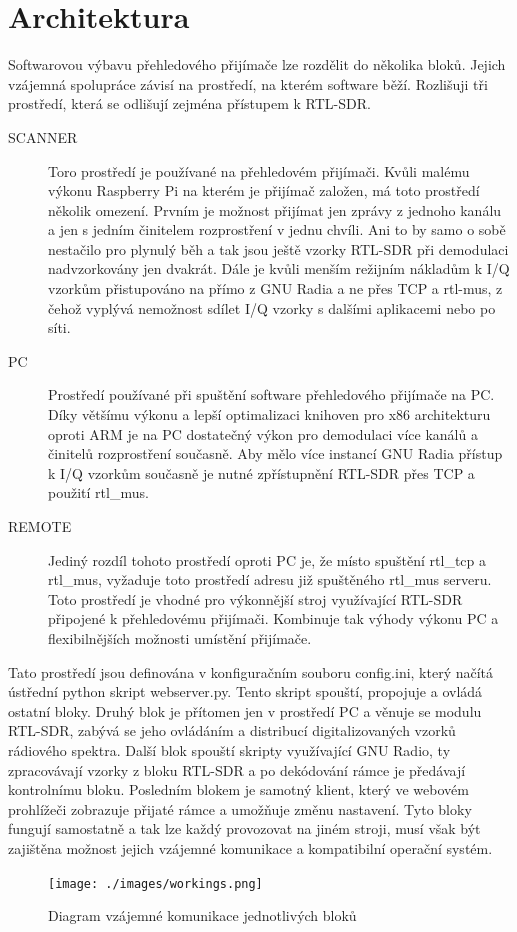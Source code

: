 \documentclass{ctuthesis}
\begin{document}
\section{Architektura}
Softwarovou výbavu přehledového přijímače lze rozdělit do několika bloků. Jejich vzájemná spolupráce závisí na prostředí, na kterém software běží. Rozlišuji tři prostředí, která se odlišují zejména přístupem k RTL-SDR.

\begin{description}
\item[SCANNER]
Toro prostředí je používané na přehledovém přijímači. Kvůli malému výkonu Raspberry Pi na kterém je přijímač založen, má toto prostředí několik omezení. Prvním je možnost přijímat jen zprávy z jednoho kanálu a jen s jedním činitelem rozprostření v jednu chvíli. Ani to by samo o sobě nestačilo pro plynulý běh a tak jsou ještě vzorky RTL-SDR při demodulaci nadvzorkovány jen dvakrát. Dále je kvůli menším režijním nákladům k I/Q vzorkům přistupováno na přímo z GNU Radia a ne přes TCP a rtl-mus, z čehož vyplývá nemožnost sdílet I/Q vzorky s dalšími aplikacemi nebo po síti.
\item[PC]
Prostředí používané při spuštění software přehledového přijímače na PC. Díky většímu výkonu a lepší optimalizaci knihoven pro x86 architekturu oproti ARM je na PC dostatečný výkon pro demodulaci více kanálů a činitelů rozprostření současně. Aby mělo více instancí GNU Radia přístup k I/Q vzorkům současně je nutné zpřístupnění RTL-SDR přes TCP a použití rtl\_mus.
\item[REMOTE]
Jediný rozdíl tohoto prostředí oproti PC je, že místo spuštění rtl\_tcp a rtl\_mus, vyžaduje toto prostředí adresu již spuštěného rtl\_mus serveru. Toto prostředí je vhodné pro výkonnější stroj využívající RTL-SDR připojené k přehledovému přijímači. Kombinuje tak výhody výkonu PC a flexibilnějších možnosti umístění přijímače.
\end{description}

Tato prostředí jsou definována v konfiguračním souboru config.ini, který načítá ústřední python skript webserver.py. Tento skript spouští, propojuje a ovládá ostatní bloky. Druhý blok je přítomen jen v prostředí PC a věnuje se modulu RTL-SDR, zabývá se jeho ovládáním a distribucí digitalizovaných vzorků rádiového spektra. Další blok spouští skripty využívající GNU Radio, ty zpracovávají vzorky z bloku RTL-SDR a po dekódování rámce je předávají kontrolnímu bloku. Posledním blokem je samotný klient, který ve webovém prohlížeči zobrazuje přijaté rámce a umožňuje změnu nastavení. Tyto bloky fungují samostatně a tak lze každý provozovat na jiném stroji, musí však být zajištěna možnost jejich vzájemné komunikace a kompatibilní operační systém.\begin{figure}
\caption{Diagram vzájemné komunikace jednotlivých bloků}
\texttt{[image: ./images/workings.png]}
\label{arch}
\end{figure}
\end{document}
